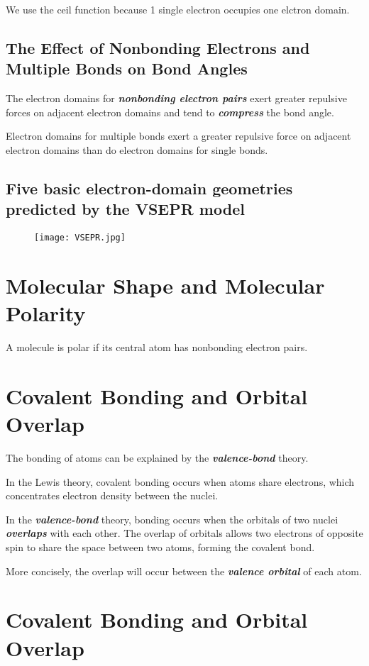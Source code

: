\documentclass[12pt, a4paper]{report}
\newcommand{\impt}[1]{\textbf{\textit{#1}}}
\newcommand{\hi}{\section}
\newcommand{\hii}{\subsection}
\begin{document}
        \par We use the ceil function because 1 single electron occupies one elctron domain.
    \hii{The Effect of Nonbonding Electrons and Multiple Bonds on Bond Angles}
        \par The electron domains for \impt{nonbonding electron pairs} exert greater repulsive
        forces on adjacent electron domains and tend to \impt{compress} the bond angle.
        \par Electron domains for multiple bonds exert a greater repulsive force on adjacent
        electron domains than do electron domains for single bonds.
    \hii{Five basic electron-domain geometries predicted by the VSEPR model}
        \par
        \begin{center}
            \begin{figure}[h]
                    \begin{center}
                        \texttt{[image: VSEPR.jpg]}
                    \end{center}
            \end{figure}
        \end{center}


\hi{Molecular Shape and Molecular Polarity}
    \par A molecule is polar if its central atom has nonbonding electron pairs.

\hi{Covalent Bonding and Orbital Overlap}
    \par The bonding of atoms can be explained by the \impt{valence-bond} theory.
    \par In the Lewis theory, covalent bonding occurs when atoms share electrons, which concentrates
    electron density between the nuclei.
    \par In the \impt{valence-bond} theory, bonding occurs when the orbitals of two nuclei
    \impt{overlaps} with each other. The overlap of orbitals allows two electrons of opposite spin
    to share the space between two atoms, forming the covalent bond.
    \par More concisely, the overlap will occur between the \impt{valence orbital} of each atom.

\hi{Covalent Bonding and Orbital Overlap}
\end{document}
